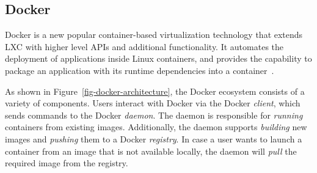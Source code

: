 


\subsection{Docker}

Docker is a new popular container-based virtualization technology that extends LXC
with higher level APIs and additional functionality. It automates the deployment of
applications inside Linux containers, and provides the capability to package an
application with its runtime dependencies into a container~\cite{slacker}.




As shown in Figure~\ref{fig-docker-architecture}, the Docker ecosystem consists
of a variety of components.
%
Users interact with Docker via the Docker \emph{client}, which sends commands
to the Docker \emph{daemon}. The daemon is responsible for \emph{running} containers
from existing images. Additionally, the daemon supports \emph{building} new images and
\emph{pushing} them to a Docker \emph{registry}. In case a user wants to launch a
container from an image that is not available locally, the daemon will \emph{pull}
the required image from the registry.

